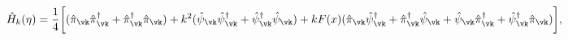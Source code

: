 \begin{equation}
\hat{H}_{k}(\eta) = \frac{1}{4} \biggl[(\hat{\pi}_{\vk} \hat{\pi}^{\dagger}_{\vk} + 
\hat{\pi}_{\vk}^{\dagger} \hat{\pi}_{\vk}) + k^2 (\hat{\psi}_{\vk} \hat{\psi}^{\dagger}_{\vk} + 
\hat{\psi}_{\vk}^{\dagger} \hat{\psi}_{\vk}) + k F(x)( \hat{\pi}_{\vk} \hat{\psi}_{\vk}^{\dagger}+ 
\hat{\pi}_{\vk}^{\dagger} \hat{\psi}_{\vk} +  \hat{\psi}_{\vk} \hat{\pi}_{\vk}^{\dagger}+ 
\hat{\psi}_{\vk}^{\dagger} \hat{\pi}_{\vk})\biggr],
\label{ham3}
\end{equation} 
